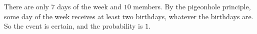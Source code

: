 There are only $7$ days of the week and $10$ members. By the pigeonhole principle, some day of the week receives at least two birthdays, whatever the birthdays are. So the event is certain, and the probability is $\boxed{1}$.
